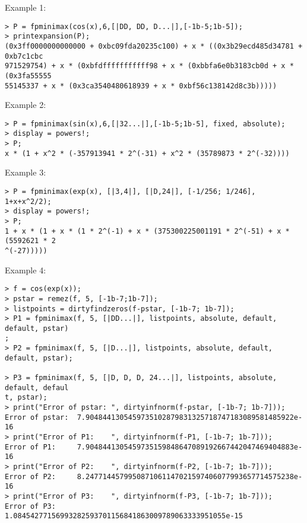 \noindent Example 1: 
\begin{center}\begin{minipage}{15cm}\begin{Verbatim}[frame=single]
> P = fpminimax(cos(x),6,[|DD, DD, D...|],[-1b-5;1b-5]);
> printexpansion(P);
(0x3ff0000000000000 + 0xbc09fda20235c100) + x * ((0x3b29ecd485d34781 + 0xb7c1cbc
971529754) + x * (0xbfdfffffffffff98 + x * (0xbbfa6e0b3183cb0d + x * (0x3fa55555
55145337 + x * (0x3ca3540480618939 + x * 0xbf56c138142d8c3b)))))
\end{Verbatim}
\end{minipage}\end{center}
\noindent Example 2: 
\begin{center}\begin{minipage}{15cm}\begin{Verbatim}[frame=single]
> P = fpminimax(sin(x),6,[|32...|],[-1b-5;1b-5], fixed, absolute);
> display = powers!;
> P;
x * (1 + x^2 * (-357913941 * 2^(-31) + x^2 * (35789873 * 2^(-32))))
\end{Verbatim}
\end{minipage}\end{center}
\noindent Example 3: 
\begin{center}\begin{minipage}{15cm}\begin{Verbatim}[frame=single]
> P = fpminimax(exp(x), [|3,4|], [|D,24|], [-1/256; 1/246], 1+x+x^2/2);
> display = powers!;
> P;
1 + x * (1 + x * (1 * 2^(-1) + x * (375300225001191 * 2^(-51) + x * (5592621 * 2
^(-27)))))
\end{Verbatim}
\end{minipage}\end{center}
\noindent Example 4: 
\begin{center}\begin{minipage}{15cm}\begin{Verbatim}[frame=single]
> f = cos(exp(x));
> pstar = remez(f, 5, [-1b-7;1b-7]);
> listpoints = dirtyfindzeros(f-pstar, [-1b-7; 1b-7]);
> P1 = fpminimax(f, 5, [|DD...|], listpoints, absolute, default, default, pstar)
;
> P2 = fpminimax(f, 5, [|D...|], listpoints, absolute, default, default, pstar);

> P3 = fpminimax(f, 5, [|D, D, D, 24...|], listpoints, absolute, default, defaul
t, pstar);
> print("Error of pstar: ", dirtyinfnorm(f-pstar, [-1b-7; 1b-7]));
Error of pstar:  7.9048441305459735102879831325718747183089581485922e-16
> print("Error of P1:    ", dirtyinfnorm(f-P1, [-1b-7; 1b-7]));
Error of P1:     7.9048441305459735159848647089192667442047469404883e-16
> print("Error of P2:    ", dirtyinfnorm(f-P2, [-1b-7; 1b-7]));
Error of P2:     8.2477144579950871061147021597406077993657714575238e-16
> print("Error of P3:    ", dirtyinfnorm(f-P3, [-1b-7; 1b-7]));
Error of P3:     1.08454277156993282593701156841863009789063333951055e-15
\end{Verbatim}
\end{minipage}\end{center}
